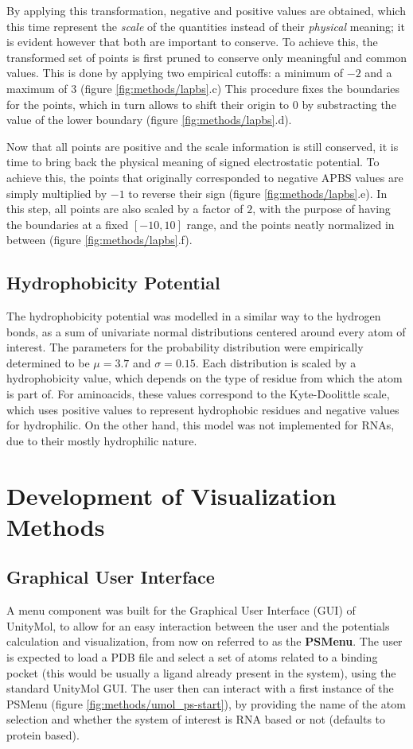     By applying this transformation, negative and positive values are obtained, which this time represent the \textit{scale} of the quantities instead of their \textit{physical} meaning; it is evident however that both are important to conserve. To achieve this, the transformed set of points is first pruned to conserve only meaningful and common values. This is done by applying two empirical cutoffs: a minimum of $-2$ and a maximum of $3$ (figure \ref{fig:methods/lapbs}.c) This procedure fixes the boundaries for the points, which in turn allows to shift their origin to 0 by substracting the value of the lower boundary (figure \ref{fig:methods/lapbs}.d).

    Now that all points are positive and the scale information is still conserved, it is time to bring back the physical meaning of signed electrostatic potential. To achieve this, the points that originally corresponded to negative APBS values are simply multiplied by $-1$ to reverse their sign (figure \ref{fig:methods/lapbs}.e). In this step, all points are also scaled by a factor of $2$, with the purpose of having the boundaries at a fixed $[-10, 10]$ range, and the points neatly normalized in between (figure \ref{fig:methods/lapbs}.f).

  \subsection{Hydrophobicity Potential}
    The hydrophobicity potential was modelled in a similar way to the hydrogen bonds, as a sum of univariate normal distributions centered around every atom of interest. The parameters for the probability distribution were empirically determined to be $\mu = 3.7$ and $\sigma = 0.15$. Each distribution is scaled by a hydrophobicity value, which depends on the type of residue from which the atom is part of. For aminoacids, these values correspond to the Kyte-Doolittle scale, which uses positive values to represent hydrophobic residues and negative values for hydrophilic. On the other hand, this model was not implemented for RNAs, due to their mostly hydrophilic nature.


\section{Development of Visualization Methods}
  \subsection{Graphical User Interface}
    A menu component was built for the Graphical User Interface (GUI) of UnityMol, to allow for an easy interaction between the user and the potentials calculation and visualization, from now on referred to as the \textbf{PSMenu}. The user is expected to load a PDB file and select a set of atoms related to a binding pocket (this would be usually a ligand already present in the system), using the standard UnityMol GUI. The user then can interact with a first instance of the PSMenu (figure \ref{fig:methods/umol_ps-start}), by providing the name of the atom selection and whether the system of interest is RNA based or not (defaults to protein based).


